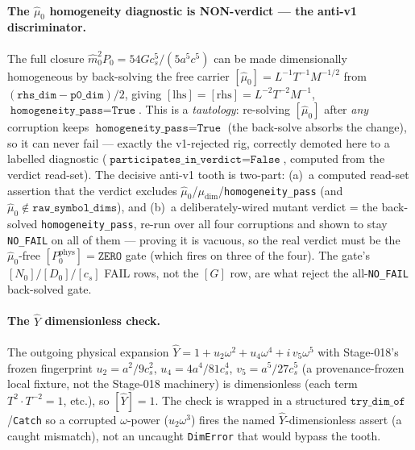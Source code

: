 \paragraph{The \texorpdfstring{\(\hat\mu_0\)}{mu0} homogeneity diagnostic is NON-verdict --- the anti-v1 discriminator.}
The full closure \(\hat m_0^2 P_0 = 54Gc_s^5/(5a^5c^5)\) can be made dimensionally homogeneous by back-solving
the free carrier \([\hat\mu_0]=L^{-1}T^{-1}M^{-1/2}\) from \((\texttt{rhs\_dim}-\texttt{p0\_dim})/2\), giving
\([\mathrm{lhs}]=[\mathrm{rhs}]=L^{-2}T^{-2}M^{-1}\), \(\texttt{homogeneity\_pass}=\texttt{True}\). This is a
\emph{tautology}: re-solving \([\hat\mu_0]\) after \emph{any} corruption keeps \(\texttt{homogeneity\_pass}=\texttt{True}\)
(the back-solve absorbs the change), so it can never fail --- exactly the v1-rejected rig, correctly demoted here to a
labelled diagnostic (\(\texttt{participates\_in\_verdict}=\texttt{False}\), computed from the verdict read-set). The
decisive anti-v1 tooth is two-part: (a)~a computed read-set assertion that the verdict excludes
\(\hat\mu_0\)/\(\mu_{\mathrm{dim}}\)/\texttt{homogeneity\_pass} (and \(\hat\mu_0\notin\texttt{raw\_symbol\_dims}\)), and
(b)~a deliberately-wired mutant verdict = the back-solved \texttt{homogeneity\_pass}, re-run over all four corruptions and
shown to stay \texttt{NO\_FAIL} on all of them --- proving it is vacuous, so the real verdict must be the \(\hat\mu_0\)-free
\([P_0^{\mathrm{phys}}]=\texttt{ZERO}\) gate (which fires on three of the four). The gate's \([N_0]/[D_0]/[c_s]\) FAIL rows,
not the \([G]\) row, are what reject the all-\texttt{NO\_FAIL} back-solved gate.

\paragraph{The \texorpdfstring{\(\hat Y\)}{Yhat} dimensionless check.}
The outgoing physical expansion \(\hat Y = 1 + u_2\omega^2 + u_4\omega^4 + i\,v_5\omega^5\) with Stage-018's frozen
fingerprint \(u_2=a^2/9c_s^2\), \(u_4=4a^4/81c_s^4\), \(v_5=a^5/27c_s^5\) (a provenance-frozen local fixture, not the
Stage-018 machinery) is dimensionless (each term \(T^2\cdot T^{-2}=1\), etc.), so \([\hat Y]=1\). The check is wrapped in a
structured \(\texttt{try\_dim\_of}\)/\texttt{Catch} so a corrupted \(\omega\)-power (\(u_2\omega^3\)) fires the named
\(\hat Y\)-dimensionless assert (a caught mismatch), not an uncaught \texttt{DimError} that would bypass the tooth.

